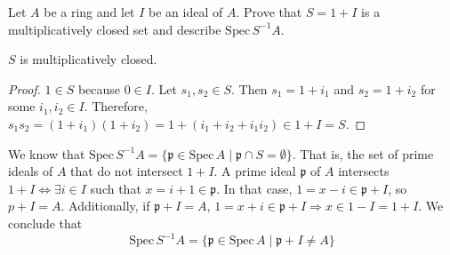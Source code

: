 \begin{problem}
Let $A$ be a ring and let $I$ be an ideal of $A$.
Prove that $S = 1 + I$ is a multiplicatively closed set and describe $\text{Spec}\,S^{-1}A$.
\begin{sol}
    \begin{claim}
        $S$ is multiplicatively closed.
        \begin{proof}
            $1 \in S$ because $0 \in I$.
            Let $s_1, s_2 \in S$.
            Then $s_1 = 1 + i_1$ and $s_2 = 1 + i_2$ for some $i_1, i_2 \in I$.
            Therefore, $s_1s_2 = (1 + i_1)(1 + i_2) = 1 + (i_1 + i_2 + i_1i_2) \in 1 + I = S$.
        \end{proof}
    \end{claim}
    We know that $\text{Spec}\,S^{-1}A = \{ \mathfrak{p} \in \text{Spec}\,A \mid \mathfrak{p} \cap S = \emptyset \}$.
    That is, the set of prime ideals of $A$ that do not intersect $1 + I$.
    A prime ideal $\mathfrak{p}$ of $A$  intersects $1 + I \iff \exists i \in I$ such that $x = i + 1 \in \mathfrak{p}$.
    In that case, $1 = x - i \in \mathfrak{p} + I$, so $p+I = A$.
    Additionally, if $\mathfrak{p}+I = A$, $1 = x + i \in \mathfrak{p}+I \Rightarrow x \in 1 - I = 1 + I$.
    We conclude that
    \[
        \text{Spec}\,S^{-1}A = \{ \mathfrak{p} \in \text{Spec}\,A \mid \mathfrak{p} + I \neq A \}
    \]



\end{sol}
\end{problem}